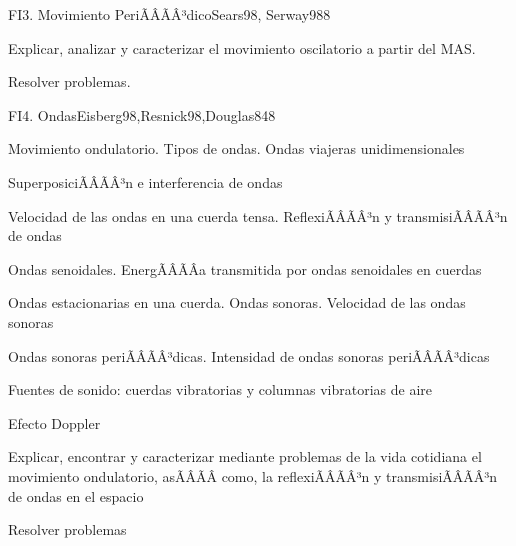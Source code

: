 \begin{sumilla}
\begin{unit}{FI3. Movimiento PeriÃÂÃÂ³dico}{Sears98, Serway98}{8}
   \begin{objetivos}
         \item  Explicar, analizar y caracterizar el movimiento oscilatorio a partir del MAS.
         \item  Resolver problemas.
   \end{objetivos}
\end{unit}

\begin{unit}{FI4. Ondas}{Eisberg98,Resnick98,Douglas84}{8}
\begin{topicos}
         \item  Movimiento ondulatorio. Tipos de ondas. Ondas viajeras unidimensionales
	 \item  SuperposiciÃÂÃÂ³n e interferencia de ondas
         \item  Velocidad de las ondas en una cuerda tensa. ReflexiÃÂÃÂ³n y transmisiÃÂÃÂ³n de ondas
	 \item  Ondas senoidales. EnergÃÂÃÂ­a transmitida por ondas senoidales en cuerdas
         \item  Ondas estacionarias en una cuerda. Ondas sonoras. Velocidad de las ondas sonoras
	 \item  Ondas sonoras periÃÂÃÂ³dicas. Intensidad de ondas sonoras periÃÂÃÂ³dicas
	 \item  Fuentes de sonido: cuerdas vibratorias y columnas vibratorias de aire
	 \item  Efecto Doppler
   \end{topicos}

   \begin{objetivos}
         \item  Explicar, encontrar y caracterizar mediante problemas de la vida cotidiana el movimiento ondulatorio, asÃÂÃÂ­ como, la reflexiÃÂÃÂ³n y transmisiÃÂÃÂ³n de ondas en el espacio
         \item  Resolver problemas
   \end{objetivos}
\end{unit}


\end{sumilla}
